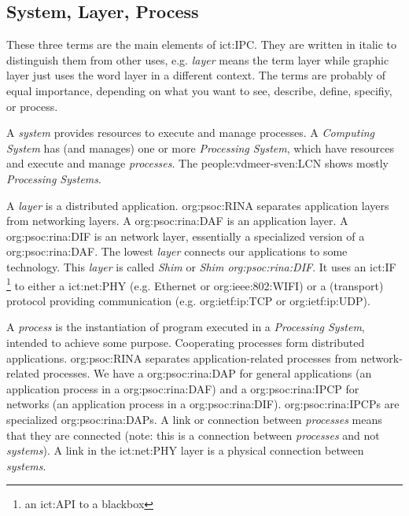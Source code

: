 \subsection{System, Layer, Process}

    These three terms are the main elements of \ac{ict:IPC}.
    They are written in italic to distinguish them from other uses, e.g. \textit{layer} means the term layer while graphic layer just uses the word layer in a different context.
    The terms are probably of equal importance, depending on what you want to see, describe, define, specifiy, or process.

    A \textit{system} provides resources to execute and manage processes.
    A \textit{Computing System} has (and manages) one or more \textit{Processing System}, which have resources and execute and manage \textit{processes}.
    The \ac{people:vdmeer-sven:LCN} shows mostly \textit{Processing Systems}.

    A \textit{layer} is a distributed application.
    \acs{org:psoc:RINA} separates application layers from networking layers.
    A \ac{org:psoc:rina:DAF} is an application layer.
    A \ac{org:psoc:rina:DIF} is an network layer, essentially a specialized version of a \ac{org:psoc:rina:DAF}.
    The lowest \textit{layer} connects our applications to some technology.
    This \textit{layer} is called \textit{Shim} or \textit{Shim \acs{org:psoc:rina:DIF}}.
    It uses an \ac{ict:IF} \footnote{an \ac{ict:API} to a blackbox} to either
        a \ac{ict:net:PHY} (e.g. Ethernet or \acs{org:ieee:802:WIFI}) or
        a (transport) protocol providing communication (e.g. \acs{org:ietf:ip:TCP} or \acs{org:ietf:ip:UDP}).

    A \textit{process} is the instantiation of program executed in a \textit{Processing System}, intended to achieve some purpose.
    Cooperating processes form distributed applications.
    \acs{org:psoc:RINA} separates application-related processes from network-related processes.
    We have a \ac{org:psoc:rina:DAP} for general applications (an application process in a \ac{org:psoc:rina:DAF}) and
        a \ac{org:psoc:rina:IPCP} for networks (an application process in a \ac{org:psoc:rina:DIF}).
    \acp{org:psoc:rina:IPCP} are specialized \acp{org:psoc:rina:DAP}.
    A link or connection between \textit{processes} means that they are connected (note: this is a connection between \textit{processes} and not \textit{systems}).
    A link in the \ac{ict:net:PHY} layer is a physical connection between \textit{systems}.

